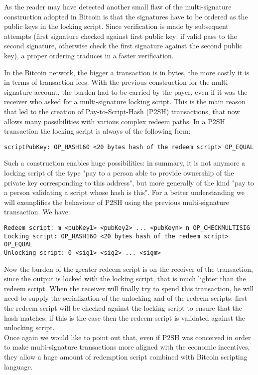 \bigskip
\noindent
As the reader may have detected another small flaw of the multi-signature construction adopted in Bitcoin is that the signatures have to be ordered as the public keys in the locking script. Since verification is made by subsequent attempts (first signature checked against first public key: if valid pass to the second signature, otherwise check the first signature against the second public key), a proper ordering traduces in a faster verification.

\bigskip
\noindent
In the Bitcoin network, the bigger a transaction is in bytes, the more costly it is in terms of transaction fees. With the previous construction for the multi-signature account, the burden had to be carried by the payer, even if it was the receiver who asked for a multi-signature locking script. This is the main reason that led to the creation of Pay-to-Script-Hash (P2SH) transactions, that now allows many possibilities with various complex redeem paths. In a P2SH transaction the locking script is always of the following form: 
\begin{lstlisting}[frame=single]
scriptPubKey: OP_HASH160 <20 bytes hash of the redeem script> OP_EQUAL
\end{lstlisting}
Such a construction enables huge possibilities: in summary, it is not anymore a locking script of the type "pay to a person able to provide ownership of the private key corresponding to this address", but more generally of the kind "pay to a person validating a script whose hash is this".
For a better understanding we will exemplifies the behaviour of P2SH using the previous multi-signature transaction.
We have:
\begin{lstlisting}[frame=single]
Redeem script: m <pubKey1> <pubKey2> ... <pubKeyn> n OP_CHECKMULTISIG
Locking script: OP_HASH160 <20 bytes hash of the redeem script> OP_EQUAL
Unlocking script: 0 <sig1> <sig2> ... <sigm>
\end{lstlisting}
Now the burden of the greater redeem script is on the receiver of the transaction, since the output is locked with the locking script, that is much lighter than the redeem script. When the receiver will finally try to spend this transaction, he will need to supply the serialization of the unlocking and of the redeem scripts: first the redeem script will be checked against the locking script to ensure that the hash matches, if this is the case then the redeem script is validated against the unlocking script.
\\
Once again we would like to point out that, even if P2SH was conceived in order to make multi-signature transactions more aligned with the economic incentives, they allow a huge amount of redemption script combined with Bitcoin scripting language.